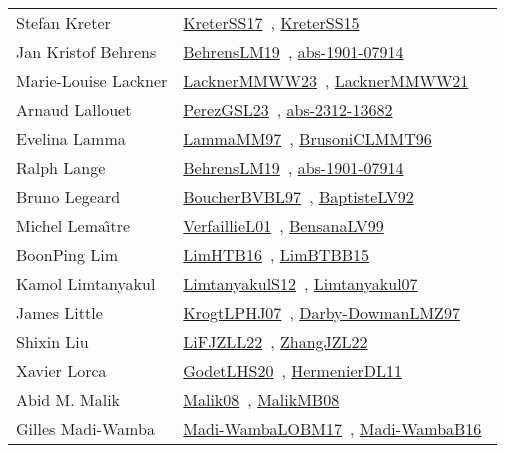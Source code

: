 {\begin{longtable}{p{4cm}p{20cm}}
Stefan Kreter & \href{works/KreterSS17.pdf}{KreterSS17}~\cite{KreterSS17}, \href{works/KreterSS15.pdf}{KreterSS15}~\cite{KreterSS15}\\
Jan Kristof Behrens & \href{works/BehrensLM19.pdf}{BehrensLM19}~\cite{BehrensLM19}, \href{works/abs-1901-07914.pdf}{abs-1901-07914}~\cite{abs-1901-07914}\\
Marie{-}Louise Lackner & \href{works/LacknerMMWW23.pdf}{LacknerMMWW23}~\cite{LacknerMMWW23}, \href{works/LacknerMMWW21.pdf}{LacknerMMWW21}~\cite{LacknerMMWW21}\\
Arnaud Lallouet & \href{works/PerezGSL23.pdf}{PerezGSL23}~\cite{PerezGSL23}, \href{works/abs-2312-13682.pdf}{abs-2312-13682}~\cite{abs-2312-13682}\\
Evelina Lamma & \href{works/LammaMM97.pdf}{LammaMM97}~\cite{LammaMM97}, \href{works/BrusoniCLMMT96.pdf}{BrusoniCLMMT96}~\cite{BrusoniCLMMT96}\\
Ralph Lange & \href{works/BehrensLM19.pdf}{BehrensLM19}~\cite{BehrensLM19}, \href{works/abs-1901-07914.pdf}{abs-1901-07914}~\cite{abs-1901-07914}\\
Bruno Legeard & \href{}{BoucherBVBL97}~\cite{BoucherBVBL97}, \href{works/BaptisteLV92.pdf}{BaptisteLV92}~\cite{BaptisteLV92}\\
Michel Lema{\^{\i}}tre & \href{works/VerfaillieL01.pdf}{VerfaillieL01}~\cite{VerfaillieL01}, \href{works/BensanaLV99.pdf}{BensanaLV99}~\cite{BensanaLV99}\\
BoonPing Lim & \href{works/LimHTB16.pdf}{LimHTB16}~\cite{LimHTB16}, \href{works/LimBTBB15.pdf}{LimBTBB15}~\cite{LimBTBB15}\\
Kamol Limtanyakul & \href{works/LimtanyakulS12.pdf}{LimtanyakulS12}~\cite{LimtanyakulS12}, \href{works/Limtanyakul07.pdf}{Limtanyakul07}~\cite{Limtanyakul07}\\
James Little & \href{works/KrogtLPHJ07.pdf}{KrogtLPHJ07}~\cite{KrogtLPHJ07}, \href{works/Darby-DowmanLMZ97.pdf}{Darby-DowmanLMZ97}~\cite{Darby-DowmanLMZ97}\\
Shixin Liu & \href{works/LiFJZLL22.pdf}{LiFJZLL22}~\cite{LiFJZLL22}, \href{works/ZhangJZL22.pdf}{ZhangJZL22}~\cite{ZhangJZL22}\\
Xavier Lorca & \href{works/GodetLHS20.pdf}{GodetLHS20}~\cite{GodetLHS20}, \href{works/HermenierDL11.pdf}{HermenierDL11}~\cite{HermenierDL11}\\
Abid M. Malik & \href{}{Malik08}~\cite{Malik08}, \href{works/MalikMB08.pdf}{MalikMB08}~\cite{MalikMB08}\\
Gilles Madi{-}Wamba & \href{works/Madi-WambaLOBM17.pdf}{Madi-WambaLOBM17}~\cite{Madi-WambaLOBM17}, \href{works/Madi-WambaB16.pdf}{Madi-WambaB16}~\cite{Madi-WambaB16}\\

\end{longtable}}
